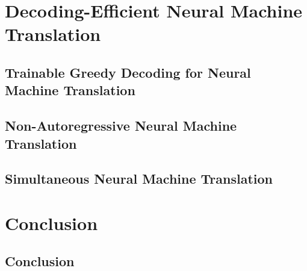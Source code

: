 \documentclass[a4paper,12pt,twoside]{book}
\begin{document}
\part{Decoding-Efficient Neural Machine Translation}
\chapter[Trainable Greedy Decoding]{Trainable Greedy Decoding for Neural Machine Translation}
\label{trainable}



\chapter{Non-Autoregressive Neural Machine Translation}
\label{nat}


\chapter{Simultaneous Neural Machine Translation}
\label{simul}



\part{Conclusion}
\chapter{Conclusion}
\label{conclusion}








\cleardoublepage %
\end{document}
